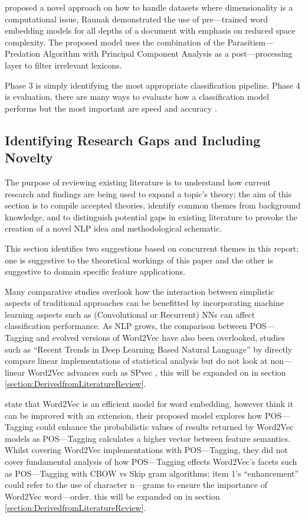 \textcite{raunak2019effective} proposed a novel approach on how to handle datasets where dimensionality is a computational issue, Raunak demonstrated the use of pre---trained word embedding models for all depths of a document with emphasis on reduced space complexity. The proposed model uses the combination of the Parasitism---Predation Algorithm with Principal Component Analysis as a post---processing layer to filter irrelevant lexicons.

Phase 3 is simply identifying the most appropriate classification pipeline. Phase 4 is evaluation, there are many ways to evaluate how a classification model performs but the most important are speed and accuracy \textcite{kowsari2019text}.

\subsection{Identifying Research Gaps and Including Novelty} \label{section:IdentifyingResearchGapsandIncludingNovelty}

The purpose of reviewing existing literature is to understand how current research and findings are being used to expand a topic’s theory; the aim of this section is to compile accepted theories, identify common themes from background knowledge, and to distinguish potential gaps in existing literature to provoke the creation of a novel NLP idea and methodological schematic.

This section identifies two suggestions based on concurrent themes in this report; one is suggestive to the theoretical workings of this paper and the other is suggestive to domain specific feature applications.

Many comparative studies overlook how the interaction between simplistic aspects of traditional approaches can be benefitted by incorporating machine learning aspects such as (Convolutional or Recurrent) NNs can affect classification performance. As NLP grows, the comparison between POS---Tagging and evolved versions of Word2Vec have also been overlooked, studies such as “Recent Trends in Deep Learning Based Natural Language” by \parencite{young2018recent} directly compare linear implementations of statistical analysis but do not look at non---linear Word2Vec advances such as SPvec \parencite{zhang2020spvec}, this will be expanded on in section \ref{section:DerivedfromLiteratureReview}.

\textcite{suleiman2019using} state that Word2Vec is an efficient model for word embedding, however think it can be improved with an extension, their proposed model explores how POS---Tagging could enhance the probabilistic values of results returned by Word2Vec models as POS---Tagging calculates a higher vector between feature semantics. Whilst covering Word2Vec implementations with POS---Tagging, they did not cover fundamental analysis of how POS---Tagging effects Word2Vec’s facets such as POS---Tagging with CBOW vs Skip gram algorithms; item 1’s “enhancement” could refer to the use of character n---grams to ensure the importance of Word2Vec word---order. this will be expanded on in section \ref{section:DerivedfromLiteratureReview}.

